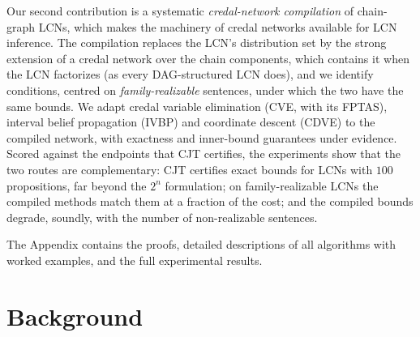 \documentclass{article} %
\DeclareRobustCommand{\rev}[1]{{\color{blue}#1}}
\begin{document}
Our second contribution is a systematic \emph{credal-network compilation} of chain-graph LCNs, which makes the machinery of credal networks \citep{cozman2000credal,maua2020ijar,l2u,antonucci2015approxlp} available for LCN inference. \rev{The compilation replaces the LCN's distribution set by the strong extension of a credal network over the chain components, which contains it when the LCN factorizes (as every DAG-structured LCN does), and we identify conditions, centred on \emph{family-realizable} sentences, under which the two have the same bounds. We adapt credal variable elimination (CVE, with its FPTAS), interval belief propagation (IVBP) and coordinate descent (CDVE) to the compiled network, with exactness and inner-bound guarantees under evidence. Scored against the endpoints that CJT certifies, the experiments show that the two routes are complementary: CJT certifies exact bounds for LCNs with $100$ propositions, far beyond the $2^n$ formulation; on family-realizable LCNs the compiled methods match them at a fraction of the cost; and the compiled bounds degrade, soundly, with the number of non-realizable sentences.}

The Appendix contains the proofs, detailed descriptions of all algorithms with worked examples, and the full experimental results.

\section{Background}
\label{sec-background}
\end{document}
